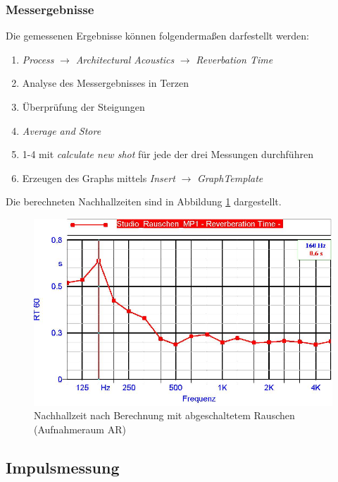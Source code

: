 \documentclass[11pt]{report}
\begin{document}
\subsubsection{Messergebnisse}
Die gemessenen Ergebnisse können folgendermaßen darfestellt werden:
\begin{enumerate}
\item \textit{Process} $\rightarrow$ \textit{Architectural Acoustics} $\rightarrow$ \textit{Reverbation Time}
\item Analyse des Messergebnisses in Terzen
\item Überprüfung der Steigungen 
\item \textit{Average and Store}
\item 1-4 mit \textit{calculate new shot} für jede der drei Messungen durchführen
\item Erzeugen des Graphs mittels \textit{Insert} $\rightarrow$ \textit{GraphTemplate}
\end{enumerate}
Die berechneten Nachhallzeiten sind in Abbildung \ref{fig:rauschenmp1} dargestellt.
\begin{figure}[htbp]
\begin{center}
\includegraphics[width=14cm,keepaspectratio=true]{RauschenMP1}
\caption{Nachhallzeit nach Berechnung mit abgeschaltetem Rauschen (Aufnahmeraum AR)}
\label{fig:rauschenmp1}
\end{center}
\end{figure}
\subsection{Impulsmessung}
\end{document}
